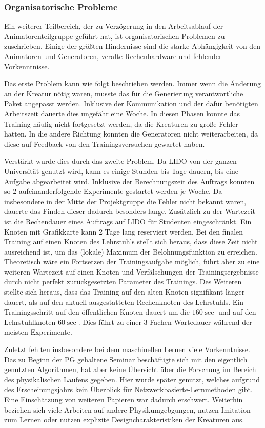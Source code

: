\subsubsection{Organisatorische Probleme}
Ein weiterer Teilbereich, der zu Verzögerung in den Arbeitsablauf der Animatorenteilgruppe geführt hat, ist organisatorischen Problemen zu zuschrieben. Einige der größten Hindernisse sind die starke Abhängigkeit von den Animatoren und Generatoren, veralte Rechenhardware und fehlender Vorkenntnisse.

Das erste Problem kann wie folgt beschrieben werden. Immer wenn die Änderung an der Kreatur nötig waren, musste das für die Generierung verantwortliche Paket angepasst werden. Inklusive der Kommunikation und der dafür benötigten Arbeitszeit dauerte dies ungefähr eine Woche. In diesen Phasen konnte das Training häufig nicht fortgesetzt werden, da die Kreaturen zu große Fehler hatten. In die andere Richtung konnten die Generatoren nicht weiterarbeiten, da diese auf Feedback von den Trainingsversuchen gewartet haben.

Verstärkt wurde dies durch das zweite Problem. Da LIDO von der ganzen Universität genutzt wird, kann es einige Stunden bis Tage dauern, bis eine Aufgabe abgearbeitet wird. Inklusive der Berechnungszeit des Auftrags konnten so 2 aufeinanderfolgende Experimente gestartet werden je Woche. Da insbesondere in der Mitte der Projektgruppe die Fehler nicht bekannt waren, dauerte das Finden dieser dadurch besonders lange. 
Zusätzlich zu der Wartezeit ist die Rechendauer eines Auftrags auf LIDO für Studenten eingeschränkt. Ein Knoten mit Grafikkarte kann 2 Tage lang reserviert werden. Bei den finalen Training auf einen Knoten des Lehrstuhls stellt sich heraus, dass diese Zeit nicht ausreichend ist, um das (lokale) Maximum der Belohnungsfunktion zu erreichen. Theoretisch wäre ein Fortsetzen der Trainingsaufgabe möglich, führt aber zu eine weiteren Wartezeit auf einen Knoten und Verfälschungen der Trainingsergebnisse durch nicht perfekt zurückgesetzten Parameter des Trainings. 
Des Weiteren stellte sich heraus, dass das Training auf den alten Knoten signifikant länger dauert, als auf den aktuell ausgestatteten Rechenknoten des Lehrstuhls. Ein Trainingsschritt auf den öffentlichen Knoten dauert um die $160 \si{\sec}$  und auf den Lehrstuhlknoten $60 \si{\sec}$. Dies führt zu einer 3-Fachen Wartedauer während der meisten Experimente.

Zuletzt fehlten insbesondere bei dem maschinellen Lernen viele Vorkenntnisse. Das zu Beginn der PG gehaltene Seminar beschäftigte sich mit den eigentlich genutzten Algorithmen, hat aber keine Übersicht über die Forschung im Bereich des physikalischen Laufens gegeben. Hier wurde später \cite{Geijtenbeek2012} genutzt, welches aufgrund des Erscheinungsjahrs kein Überblick für Netzwerkbasierte-Lernmethoden gibt. Eine Einschätzung von weiteren Papieren war dadurch erschwert. Weiterhin beziehen sich viele Arbeiten auf andere Physikumgebgungen, nutzen Imitation zum Lernen oder nutzen explizite Designcharakteristiken der Kreaturen aus\cite{Mourot2022}.

